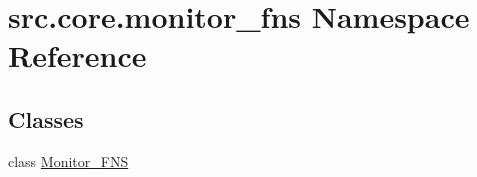 \hypertarget{namespacesrc_1_1core_1_1monitor__fns}{}\section{src.\+core.\+monitor\+\_\+fns Namespace Reference}
\label{namespacesrc_1_1core_1_1monitor__fns}
\subsection*{Classes}
\begin{DoxyCompactItemize}
\item 
class \hyperlink{classsrc_1_1core_1_1monitor__fns_1_1Monitor__FNS}{Monitor\+\_\+\+F\+N\+S}
\end{DoxyCompactItemize}
